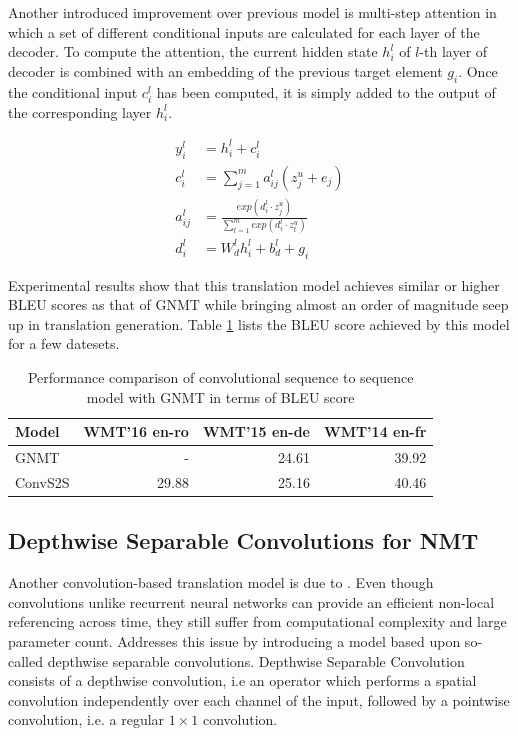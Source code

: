 \documentclass[a4paper]{article}
\begin{document}
Another  introduced  improvement over  previous model is multi-step attention in
which a set of different conditional inputs are calculated for each layer of the
decoder. To compute the attention,  the current  hidden  state $h^l_i$ of $l$-th
layer of decoder  is combined with an  embedding of the previous target  element
$g_i$. Once  the conditional input $c_i^l$ has been computed, it is simply added
to the output of the corresponding layer $h^l_i$.


\begin{align*}
  y_i^l &= h_i^l + c_i^l \\
  c_i^l &= \sum_{j = 1}^{m}{a_{ij}^l (z_j^u + e_j)} \\
  a_{ij}^l &= \frac{exp (d_i^l \cdot z_j^u)}
  {\sum_{t = 1}^{m}{exp (d_i^l \cdot z_t^u)}} \\
  d_i^l &= W_d^l h_i^l + b_d^l + g_i
\end{align*}


Experimental results show that this translation model achieves similar or higher
BLEU scores  as that of GNMT while bringing almost an order of magnitude seep up
in translation generation. Table \ref{tab:convseq2seqbleu} lists the  BLEU score
achieved by this model for a few datesets.


\begin{table}
  \center
  \begin{tabular}{lrrr}
  \hline
    Model & WMT'16 en-ro & WMT'15 en-de & WMT'14 en-fr \\
  \hline
    GNMT & - & 24.61 & 39.92 \\
    ConvS2S & 29.88 & 25.16 & 40.46 \\
  \hline
  \end{tabular}
  \caption{Performance  comparison of convolutional  sequence to  sequence model
  with GNMT in terms of BLEU score}
  \label{tab:convseq2seqbleu}
\end{table}


\subsection{Depthwise Separable Convolutions for NMT}

Another     convolution-based      translation      model     is     due      to
\citet{DBLP:journals/corr/KaiserGC17}. Even though convolutions unlike recurrent
neural networks can provide an efficient non-local referencing across time, they
still  suffer   from  computational   complexity  and   large  parameter  count.
\cite{DBLP:journals/corr/KaiserGC17} Addresses this issue by introducing a model
based upon  so-called  depthwise  separable  convolutions.  Depthwise  Separable
Convolution  consists of a depthwise convolution, i.e an operator which performs
a spatial convolution independently over each  channel of the input, followed by
a pointwise convolution, i.e. a regular $1 \times 1$ convolution.
\end{document}
